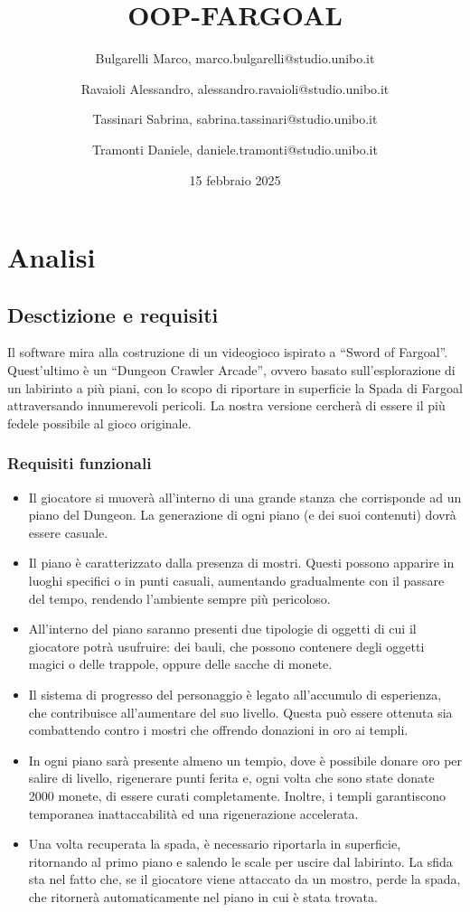 \documentclass{report}
\title{OOP-FARGOAL}
\author{
    Bulgarelli Marco, marco.bulgarelli@studio.unibo.it \and 
    Ravaioli Alessandro, alessandro.ravaioli@studio.unibo.it \and
    Tassinari Sabrina, sabrina.tassinari@studio.unibo.it \and
    Tramonti Daniele, daniele.tramonti@studio.unibo.it 
}
\date{15 febbraio 2025}
\begin{document}
\maketitle

\tableofcontents

\chapter{Analisi}

\section{Desctizione e requisiti}

Il software mira alla costruzione di un videogioco ispirato a “Sword of Fargoal”. 
%
Quest’ultimo è un “Dungeon Crawler Arcade”, ovvero basato sull’esplorazione di un labirinto a più piani, con lo scopo di riportare in superficie la Spada di Fargoal attraversando innumerevoli pericoli. 
%
La nostra versione cercherà di essere il più fedele possibile al gioco originale.

\subsection{Requisiti funzionali}
\begin{itemize}
    \item Il giocatore si muoverà all’interno di una grande stanza che corrisponde ad un piano del Dungeon. La generazione di ogni piano (e dei suoi contenuti) dovrà essere casuale.
    \item Il piano è caratterizzato dalla presenza di mostri. Questi possono apparire in luoghi specifici o in punti casuali, aumentando gradualmente con il passare del tempo, rendendo l’ambiente sempre più pericoloso.
    \item All’interno del piano saranno presenti due tipologie di oggetti di cui il giocatore potrà usufruire: dei bauli, che possono contenere degli oggetti magici o delle trappole, oppure delle sacche di monete.
    \item Il sistema di progresso del personaggio è legato all’accumulo di esperienza, che contribuisce all’aumentare del suo livello. Questa può essere ottenuta sia combattendo contro i mostri che offrendo donazioni in oro ai templi.
    \item In ogni piano sarà presente almeno un tempio, dove è possibile donare oro per salire di livello, rigenerare punti ferita e, ogni volta che sono state donate 2000 monete, di essere curati completamente. Inoltre, i templi garantiscono temporanea inattaccabilità ed una rigenerazione accelerata.
    \item Una volta recuperata la spada, è necessario riportarla in superficie, ritornando al primo piano e salendo le scale per uscire dal labirinto. La sfida sta nel fatto che, se il giocatore viene attaccato da un mostro, perde la spada, che ritornerà automaticamente nel piano in cui è stata trovata.
\end{itemize}
\end{document}
